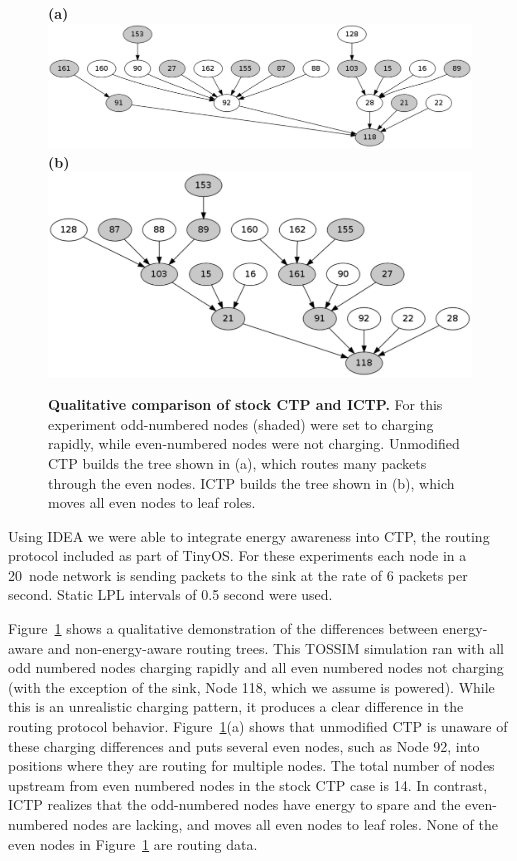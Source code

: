 \begin{figure}[t]
\begin{center}
\textbf{(a)}\\
\includegraphics[width=0.7\hsize]{./5-idea/figs/ctp.pdf}\\
\textbf{(b)}\\
\includegraphics[width=0.7\hsize]{./5-idea/figs/ictp.pdf}\\
\end{center}

\caption{\textbf{Qualitative comparison of stock CTP and ICTP.} For this
experiment odd-numbered nodes (shaded) were set to charging rapidly, while
even-numbered nodes were not charging. Unmodified CTP builds the tree shown
in (a), which routes many packets through the even nodes. ICTP builds the
tree shown in (b), which moves all even nodes to leaf roles.}

\label{idea-fig-ictpqualitative}
\end{figure}

Using IDEA we were able to integrate energy awareness into CTP, the routing
protocol included as part of TinyOS. For these experiments each node in a
20~node network is sending packets to the sink at the rate of 6 packets per
second. Static LPL intervals of 0.5 second were used. 

Figure~\ref{idea-fig-ictpqualitative} shows a qualitative demonstration of
the differences between energy-aware and non-energy-aware routing trees. This
TOSSIM simulation ran with all odd numbered nodes charging rapidly and all
even numbered nodes not charging (with the exception of the sink, Node 118,
which we assume is powered). While this is an unrealistic charging pattern,
it produces a clear difference in the routing protocol behavior.
Figure~\ref{idea-fig-ictpqualitative}(a) shows that unmodified CTP is unaware
of these charging differences and puts several even nodes, such as Node 92,
into positions where they are routing for multiple nodes. The total number of
nodes upstream from even numbered nodes in the stock CTP case is 14. In
contrast, ICTP realizes that the odd-numbered nodes have energy to spare and
the even-numbered nodes are lacking, and moves all even nodes to leaf roles.
None of the even nodes in Figure~\ref{idea-fig-ictpqualitative} are routing
data.

